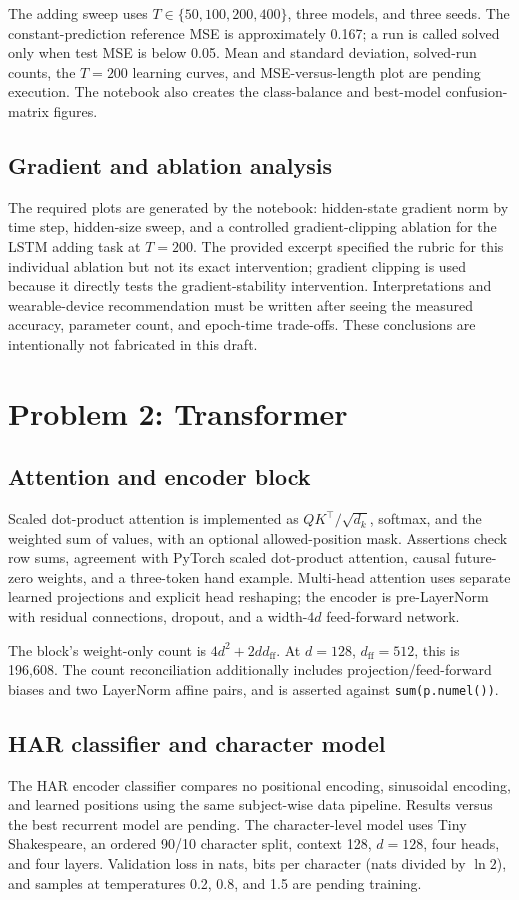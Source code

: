 \documentclass[11pt,a4paper]{article}
\begin{document}
The adding sweep uses \(T\in\{50,100,200,400\}\), three models, and three seeds. The constant-prediction reference MSE is approximately 0.167; a run is called solved only when test MSE is below 0.05. Mean and standard deviation, solved-run counts, the \(T=200\) learning curves, and MSE-versus-length plot are pending execution. The notebook also creates the class-balance and best-model confusion-matrix figures.

\subsection{Gradient and ablation analysis}
The required plots are generated by the notebook: hidden-state gradient norm by time step, hidden-size sweep, and a controlled gradient-clipping ablation for the LSTM adding task at \(T=200\). The provided excerpt specified the rubric for this individual ablation but not its exact intervention; gradient clipping is used because it directly tests the gradient-stability intervention. Interpretations and wearable-device recommendation must be written after seeing the measured accuracy, parameter count, and epoch-time trade-offs. These conclusions are intentionally not fabricated in this draft.

\section{Problem 2: Transformer}
\subsection{Attention and encoder block}
Scaled dot-product attention is implemented as \(QK^\top/\sqrt{d_k}\), softmax, and the weighted sum of values, with an optional allowed-position mask. Assertions check row sums, agreement with PyTorch scaled dot-product attention, causal future-zero weights, and a three-token hand example. Multi-head attention uses separate learned projections and explicit head reshaping; the encoder is pre-LayerNorm with residual connections, dropout, and a width-\(4d\) feed-forward network.

The block's weight-only count is \(4d^2+2dd_{\mathrm{ff}}\). At \(d=128\), \(d_{\mathrm{ff}}=512\), this is 196,608. The count reconciliation additionally includes projection/feed-forward biases and two LayerNorm affine pairs, and is asserted against \texttt{sum(p.numel())}.

\subsection{HAR classifier and character model}
The HAR encoder classifier compares no positional encoding, sinusoidal encoding, and learned positions using the same subject-wise data pipeline. Results versus the best recurrent model are pending. The character-level model uses Tiny Shakespeare, an ordered 90/10 character split, context 128, \(d=128\), four heads, and four layers. Validation loss in nats, bits per character (nats divided by \(\ln 2\)), and samples at temperatures 0.2, 0.8, and 1.5 are pending training.
\end{document}
